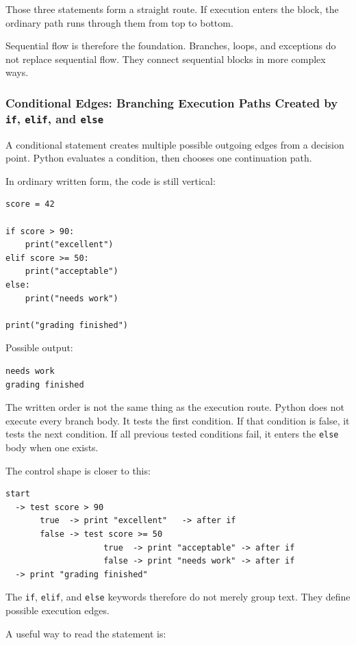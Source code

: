 \documentclass[a4paper,twoside]{report}
\begin{document}
Those three statements form a straight route. If execution enters the block, the ordinary path runs through them from top to bottom.

Sequential flow is therefore the foundation. Branches, loops, and exceptions do not replace sequential flow. They connect sequential blocks in more complex ways.

\subsubsection{Conditional Edges: Branching Execution Paths Created by \texttt{if}, \texttt{elif}, and \texttt{else}}

A conditional statement creates multiple possible outgoing edges from a decision point. Python evaluates a condition, then chooses one continuation path.

In ordinary written form, the code is still vertical:

\begin{verbatim}
score = 42

if score > 90:
    print("excellent")
elif score >= 50:
    print("acceptable")
else:
    print("needs work")

print("grading finished")
\end{verbatim}

Possible output:

\begin{verbatim}
needs work
grading finished
\end{verbatim}

The written order is not the same thing as the execution route. Python does not execute every branch body. It tests the first condition. If that condition is false, it tests the next condition. If all previous tested conditions fail, it enters the \texttt{else} body when one exists.

The control shape is closer to this:

\begin{verbatim}
start
  -> test score > 90
       true  -> print "excellent"   -> after if
       false -> test score >= 50
                    true  -> print "acceptable" -> after if
                    false -> print "needs work" -> after if
  -> print "grading finished"
\end{verbatim}

The \texttt{if}, \texttt{elif}, and \texttt{else} keywords therefore do not merely group text. They define possible execution edges.

A useful way to read the statement is:
\end{document}
